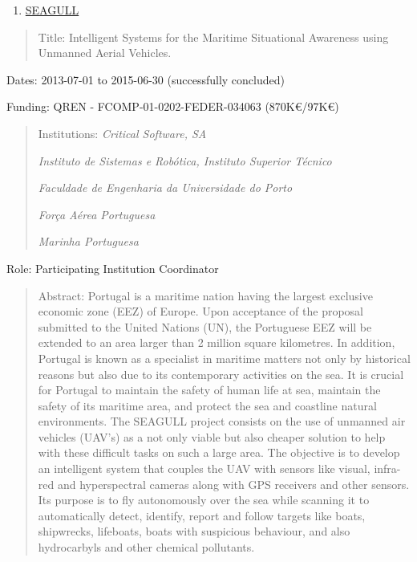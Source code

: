 \begin{enumerate}
\def\labelenumi{\arabic{enumi}.}
\setcounter{enumi}{3}
\item
  \ul{SEAGULL}
\end{enumerate}

\begin{quote}
Title: Intelligent Systems for the Maritime Situational Awareness using
Unmanned Aerial Vehicles.
\end{quote}

Dates: 2013-07-01 to 2015-06-30 (successfully concluded)

Funding: QREN - FCOMP-01-0202-FEDER-034063 (870K€/97K€)

\begin{quote}
Institutions: \emph{Critical Software, SA}

\emph{Instituto de Sistemas e Robótica, Instituto Superior Técnico}

\emph{Faculdade de Engenharia da Universidade do Porto}

\emph{Força Aérea Portuguesa}

\emph{Marinha Portuguesa}
\end{quote}

Role: Participating Institution Coordinator

\begin{quote}
Abstract: Portugal is a maritime nation having the largest exclusive
economic zone (EEZ) of Europe. Upon acceptance of the proposal submitted
to the United Nations (UN), the Portuguese EEZ will be extended to an
area larger than 2 million square kilometres. In addition, Portugal is
known as a specialist in maritime matters not only by historical reasons
but also due to its contemporary activities on the sea. It is crucial
for Portugal to maintain the safety of human life at sea, maintain the
safety of its maritime area, and protect the sea and coastline natural
environments. The SEAGULL project consists on the use of unmanned air
vehicles (UAV's) as a not only viable but also cheaper solution to help
with these difficult tasks on such a large area. The objective is to
develop an intelligent system that couples the UAV with sensors like
visual, infra-red and hyperspectral cameras along with GPS receivers and
other sensors. Its purpose is to fly autonomously over the sea while
scanning it to automatically detect, identify, report and follow targets
like boats, shipwrecks, lifeboats, boats with suspicious behaviour, and
also hydrocarbyls and other chemical pollutants.
\end{quote}

